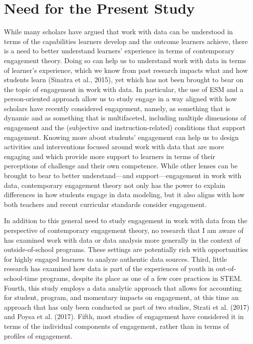 \documentclass[]{book}
\theoremstyle{definition}
\theoremstyle{definition}
\theoremstyle{definition}
\theoremstyle{remark}
\begin{document}
\section{Need for the Present Study}\label{need-for-the-present-study}

While many scholars have argued that work with data can be understood in
terms of the capabilities learners develop and the outcome learners
achieve, there is a need to better understand learners' experience in
terms of contemporary engagement theory. Doing so can help us to
understand work with data in terms of learner's experience, which we
know from past research impacts what and how students learn (Sinatra et
al., 2015), yet which has not been brought to bear on the topic of
engagement in work with data. In particular, the use of ESM and a
person-oriented approach allow us to study engage in a way aligned with
how scholars have recently considered engagement, namely, as something
that is dynamic and as something that is multifaceted, including
multiple dimensions of engagement and the (subjective and
instruction-related) conditions that support engagement. Knowing more
about students' engagement can help us to design activities and
interventions focused around work with data that are more engaging and
which provide more support to learners in terms of their perceptions of
challenge and their own competence. While other lenses can be brought to
bear to better understand---and support---engagement in work with data,
contemporary engagement theory not only has the power to explain
differences in how students engage in data modeling, but it also aligns
with how both teachers and recent curricular standards consider
engagement.

In addition to this general need to study engagement in work with data
from the perspective of contemporary engagement theory, no research that
I am aware of has examined work with data or data analysis more
generally in the context of outside-of-school programs. These settings
are potentially rich with opportunities for highly engaged learners to
analyze authentic data sources. Third, little research has examined how
data is part of the experiences of youth in out-of-school-time programs,
despite its place as one of a few core practices in STEM. Fourth, this
study employs a data analytic approach that allows for accounting for
student, program, and momentary impacts on engagement, at this time an
approach that has only been conducted as part of two studies, Strati et
al. (2017) and Poysa et al. (2017). Fifth, most studies of engagement
have considered it in terms of the individual components of engagement,
rather than in terms of profiles of engagement.
\end{document}
